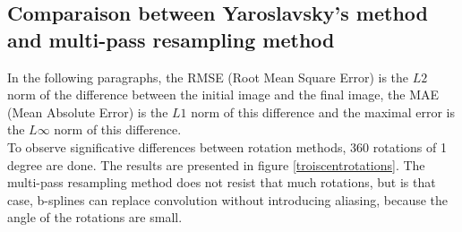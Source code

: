 
\subsection{Comparaison between Yaroslavsky's method and multi-pass resampling method}


	In the following paragraphs, the RMSE (Root Mean Square Error) is the $L2$ norm of the difference between the initial image and the final image, the MAE (Mean Absolute Error) is the $L1$ norm of this difference and the maximal error is the $L\infty$ norm of this difference.\\


	To observe significative differences between rotation methods, 360 rotations of 1 degree are done. The results are presented in figure \ref{troiscentrotations}. The multi-pass resampling method does not resist that much rotations, but is that case, b-splines can replace convolution without introducing aliasing, because the angle of the rotations are small.
	\label{pleinsderotations}

